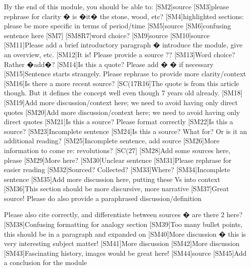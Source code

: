 \documentclass{book}
\begin{document}
By the end of this module, you should be able to:
[SM2]source
[SM3]please rephrase for clarity � is �it� the stone, wood, etc?
[SM4]highlighted sections: please be more specific in terms of period/time
[SM5]source
[SM6]confusing sentence here
[SM7]
[SM8R7]word choice?
[SM9]source
[SM10]source
[SM11]Please add a brief introductory paragraph � introduce the module, give an overview, etc.
[SM12]It is! Please provide a source ??
[SM13]Word choice?
 Rather �add�?
[SM14]Is this a quote? Please add � � if necessary
[SM15]Sentence starts strangely. Please rephrase to provide more clarity/context
[SM16]Is there a more recent source?
[SC(17R16]The quote is from this article though.  But it defines the concept well even though 7 years old already.
[SM18]
[SM19]Add more discussion/context here; we need to avoid having only direct quotes
[SM20]Add more discussion/context here; we need to avoid having only direct quotes
[SM21]Is this a source? Please format correctly
[SM22]Is this a source?
[SM23]Incomplete sentence
[SM24]Is this a source? What for? Or is it an additional reading?
[SM25]Incomplete sentence, add source
[SM26]More information to come re: revolutions?
[SC(27]
[SM28]Add some sources here, please
[SM29]More here?
[SM30]Unclear sentence
[SM31]Please rephrase for easier reading
[SM32]Sourced? Collected?
[SM33]Where?
[SM34]Incomplete sentence
[SM35]Add more discussion here, putting these Vs into context
[SM36]This section should be more discursive, more narrative
[SM37]Great source! Please do also provide a paraphrased discussion/definition


Please also cite correctly, and differentiate between sources � are there 2 here?
[SM38]Confusing formatting for analogy section
[SM39]Too many bullet points, this should be in a paragraph and expanded on
[SM40]More discussion � this is very interesting subject matter!
[SM41]More discussion
[SM42]More discussion
[SM43]Fascinating history, images would be great here!
[SM44]source
[SM45]Add a conclusion for the module
\end{document}
